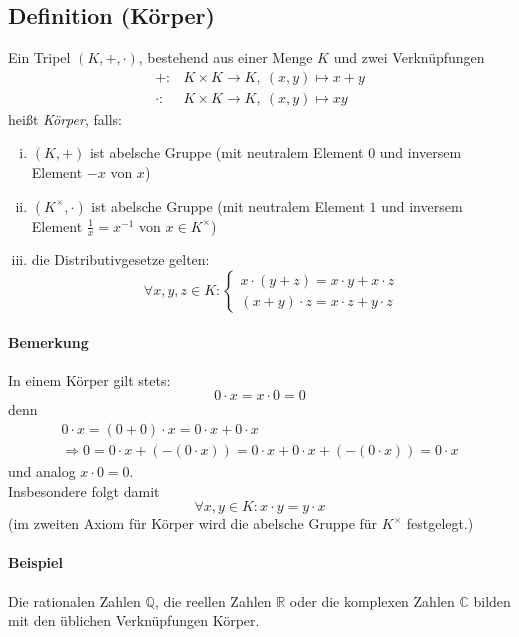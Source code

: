  \subsection{Definition (Körper)}
 	\begin{Definition}[Körper]
 		Ein Tripel $(K,+,\cdot)$, bestehend aus einer Menge $K$ und zwei Verknüpfungen
 		\begin{align*}
 			+:      & K\times K\to K,\ (x,y)\mapsto x+y \\
 			\cdot : & K\times K\to K,\ (x,y)\mapsto xy
 		\end{align*}
 		heißt \emph{Körper}, falls:
 		\begin{enumerate}[(i)]
 			\item $(K,+)$ ist abelsche Gruppe (mit neutralem Element $0$ und inversem Element $-x$ von $x$)
 			\item $(K^\times,\cdot)$ ist abelsche Gruppe (mit neutralem Element $1$ und inversem Element $\frac{1}{x} = x^{-1}$ von $x\in K^\times$)
 			\item die Distributivgesetze gelten:
 			      \[
 			      	\forall x,y,z\in K :
 			      	\begin{cases}x\cdot (y+z) = x\cdot y+x\cdot z\\ (x+y)\cdot z = x\cdot z+y\cdot z \end{cases}
 			      \]
 		\end{enumerate}
 	\end{Definition}

 	\paragraph{Bemerkung}
 		In einem Körper gilt stets:
 		\[
 			0\cdot x = x\cdot 0 = 0
 		\]
 		denn
 		\begin{gather*}
 			0\cdot x = (0+0)\cdot x = 0\cdot x + 0\cdot x \\
 			\Rightarrow 0 = 0\cdot x + (-(0\cdot x)) = 0\cdot x + 0\cdot x + (-(0\cdot x)) = 0\cdot x
 		\end{gather*}
 		und analog $x\cdot 0 = 0$.\\
 		Insbesondere folgt damit
 		\[
 			\forall x,y\in K: x\cdot y = y\cdot x
 		\]
 		(im zweiten Axiom für Körper wird die abelsche Gruppe für $K^\times$ festgelegt.)

 	\paragraph{Beispiel}
 		Die rationalen Zahlen $\mathbb{Q}$, die reellen Zahlen $\mathbb{R}$ oder die komplexen Zahlen $\mathbb{C}$ bilden mit den üblichen Verknüpfungen Körper.

